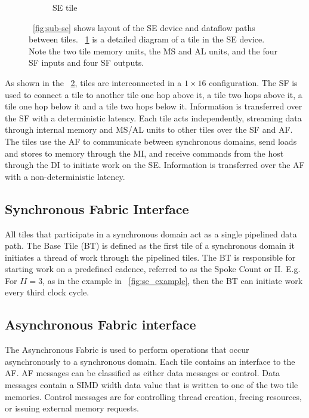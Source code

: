 \begin{figure} [h]
\begin{subfigure}{.5\textwidth}
  \caption{SE tile}
  \label{fig:sub-tile}
  \end{subfigure}
  \caption{
    \figurename~\ref{fig:sub-se} shows layout of the SE device and dataflow paths between tiles. \figurename~\ref{fig:sub-tile} is a detailed diagram of a tile in the SE device. 
    Note the two tile memory units, the MS and AL units, and the four SF inputs and four SF outputs.
  }
  \label{fig:se_diagram}
\end{figure}

As shown in the \figurename~\ref{fig:se_diagram}, tiles are interconnected in a $1 \times 16$ configuration.
The SF is used to connect a tile to another tile one hop above it, a tile two hops above it, a tile one hop below it and a tile two hops below it.
Information is transferred over the SF with a deterministic latency. 
Each tile acts independently, streaming data through internal memory and MS/AL units to other tiles over the SF and AF.
The tiles use the AF to communicate between synchronous domains, send loads
 and stores to memory through the MI, and receive commands from the host through the DI to initiate work on the SE.
Information is transferred over the AF with a non-deterministic latency.


\subsection{Synchronous Fabric Interface}
All tiles that participate in a synchronous domain act as a single pipelined data path.
The Base Tile (BT) is defined as the first tile of a synchronous domain it initiates a thread of work through the pipelined tiles.
The BT is responsible for starting work on a predefined cadence, referred to as the Spoke Count or II.
E.g. For $II = 3$, as in the example in \figurename~\ref{fig:se_example}, then the BT can initiate work every third clock cycle.

\subsection{Asynchronous Fabric interface}
The Asynchronous Fabric is used to perform operations that occur asynchronously to a synchronous domain.
Each tile contains an interface to the AF.
AF messages can be classified as either data messages or control.
Data messages contain a SIMD width data value that is written to one of the two tile memories.
Control messages are for controlling thread creation, freeing resources, or issuing external memory requests.

